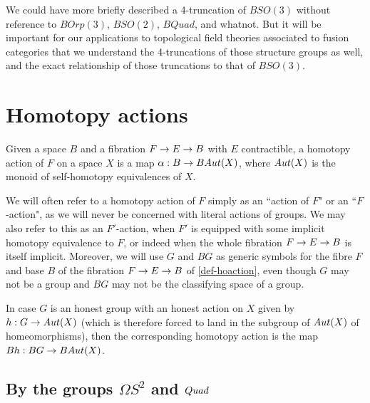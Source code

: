 \documentclass{amsart}
\begin{document}
We could have more briefly described a 4-truncation of $BSO(3)$ without reference to $BOrp(3)$, $BSO(2)$, $BQuad$, and whatnot.  But it will be important for our applications to topological field theories associated to fusion categories that we understand the 4-truncations of those structure groups as well, and the exact relationship of those truncations to that of $BSO(3)$.


\section{Homotopy actions}


\begin{definition} 
\label{def-hoaction}
Given a space $B$ and a fibration $F \rightarrow E \rightarrow B$ with $E$ contractible, a homotopy action of $F$ on a space $X$ is a map $\alpha: B \rightarrow BAut(X)$, where $Aut(X)$ is the monoid of self-homotopy equivalences of $X$.
\end{definition}
\nid We will often refer to a homotopy action of $F$ simply as an ``action of $F$" or an ``$F$-action", as we will never be concerned with literal actions of groups.  We may also refer to this as an $F'$-action, when $F'$ is equipped with some implicit homotopy equivalence to $F$, or indeed when the whole fibration $F \rightarrow E \rightarrow B$ is itself implicit.  Moreover, we will use $G$ and $BG$ as generic symbols for the fibre $F$ and base $B$ of the fibration $F \rightarrow E \rightarrow B$ of \cref{def-hoaction}, even though $G$ may not be a group and $BG$ may not be the classifying space of a group.

In case $G$ is an honest group with an honest action on $X$ given by $h: G \rightarrow Aut(X)$ (which is therefore forced to land in the subgroup of $Aut(X)$ of homeomorphisms), then the corresponding homotopy action is the map $Bh: BG \rightarrow BAut(X)$.


\subsection{By the groups $\Omega S^2$ and $Quad$} \label{sec-quadaction}
\end{document}
